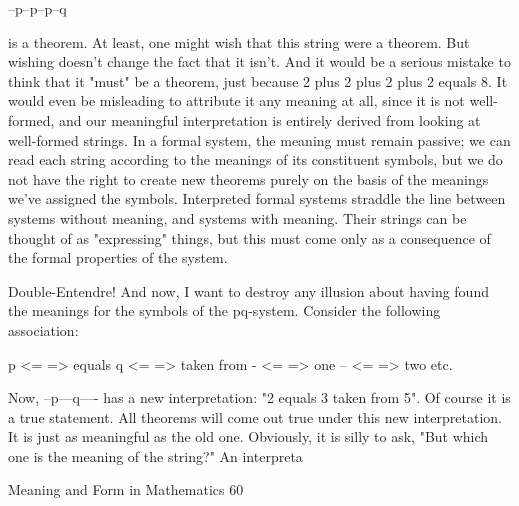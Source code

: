                                         --p--p--p--q

is a theorem. At least, one might wish that this string were a theorem. But wishing doesn't
change the fact that it isn't. And it would be a serious mistake to think that it "must" be a
theorem, just because 2 plus 2 plus 2 plus 2 equals 8. It would even be misleading to
attribute it any meaning at all, since it is not well-formed, and our meaningful
interpretation is entirely derived from looking at well-formed strings.
        In a formal system, the meaning must remain passive; we can read each string
according to the meanings of its constituent symbols, but we do not have the right to
create new theorems purely on the basis of the meanings we've assigned the symbols.
Interpreted formal systems straddle the line between systems without meaning, and
systems with meaning. Their strings can be thought of as "expressing" things, but this
must come only as a consequence of the formal properties of the system.

                                  Double-Entendre!
And now, I want to destroy any illusion about having found the meanings for the symbols
of the pq-system. Consider the following association:

                                      p <= => equals
                                      q <= => taken from
                                      - <= => one
                                      -- <= => two
                                            etc.

Now, --p---q---- has a new interpretation: "2 equals 3 taken from 5". Of course it is a true
statement. All theorems will come out true under this new interpretation. It is just as
meaningful as the old one. Obviously, it is silly to ask, "But which one is the meaning of
the string?" An interpreta




Meaning and Form in Mathematics                                                           60

